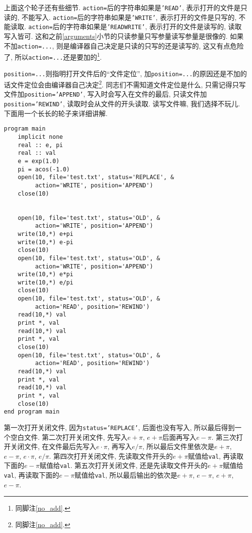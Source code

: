 上面这个轮子还有些细节. \texttt{action=}后的字符串如果是\texttt{'READ'}, 表示打开的文件是只读的, 不能写入. \texttt{action=}后的字符串如果是\texttt{'WRITE'}, 表示打开的文件是只写的, 不能读取. \texttt{action=}后的字符串如果是\texttt{'READWRITE'}, 表示打开的文件是读写的, 读取写入皆可. 这和之前\ref{arguments}小节的只读参量只写参量读写参量是很像的. 如果不加\texttt{action=...}, 则是编译器自己决定是只读的只写的还是读写的, 这又有点危险了, 所以\texttt{action=...}还是要加的\footnote{同脚注\ref{no_add}.}.

\texttt{position=...}则指明打开文件后的``文件定位'', 加\texttt{position=...}的原因还是不加的话文件定位会由编译器自己决定\footnote{同脚注\ref{no_add}.}. 同志们不需知道文件定位是什么, 只需记得只写文件加\texttt{position='APPEND'}, 写入时会写入在文件的最后, 只读文件加\texttt{position='REWIND'}, 读取时会从文件的开头读取. 读写文件嘛, 我们选择不玩儿. 下面用一个长长的轮子来详细讲解.
\begin{lstlisting}
program main
    implicit none
    real :: e, pi
    real :: val
    e = exp(1.0)
    pi = acos(-1.0)
    open(10, file='test.txt', status='REPLACE', &
         action='WRITE', position='APPEND')
    close(10)


    open(10, file='test.txt', status='OLD', &
         action='WRITE', position='APPEND')
    write(10,*) e+pi
    write(10,*) e-pi
    close(10)
    open(10, file='test.txt', status='OLD', &
         action='WRITE', position='APPEND')
    write(10,*) e*pi
    write(10,*) e/pi
    close(10)
    open(10, file='test.txt', status='OLD', &
         action='READ', position='REWIND')
    read(10,*) val
    print *, val
    read(10,*) val
    print *, val
    close(10)
    open(10, file='test.txt', status='OLD', &
         action='READ', position='REWIND')
    read(10,*) val
    print *, val
    read(10,*) val
    print *, val
    close(10)
end program main
\end{lstlisting}
第一次打开关闭文件, 因为\texttt{status='REPLACE'}, 后面也没有写入, 所以最后得到一个空白文件. 第二次打开关闭文件, 先写入$e+\pi$, $e+\pi$后面再写入$e-\pi$. 第三次打开关闭文件, 在文件最后先写入$e\cdot\pi$, 再写入$e/\pi$, 所以最后文件里依次是$e+\pi$, $e-\pi$, $e\cdot\pi$, $e/\pi$. 第四次打开关闭文件, 先读取文件开头的$e+\pi$赋值给\texttt{val}, 再读取下面的$e-\pi$赋值给\texttt{val}. 第五次打开关闭文件, 还是先读取文件开头的$e+\pi$赋值给\texttt{val}, 再读取下面的$e-\pi$赋值给\texttt{val}, 所以最后输出的依次是$e+\pi$, $e-\pi$, $e+\pi$, $e-\pi$.

